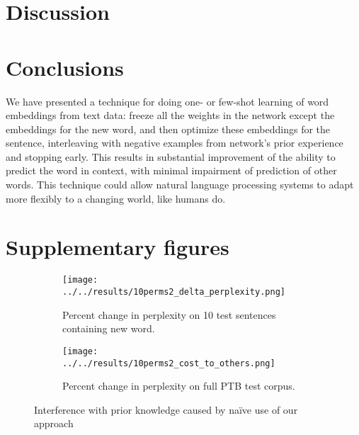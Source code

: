 \documentclass{article}
\begin{document}
\section{Discussion}

\section{Conclusions}
We have presented a technique for doing one- or few-shot learning of word embeddings from text data: freeze all the weights in the network except the embeddings for the new word, and then optimize these embeddings for the sentence, interleaving with negative examples from network's prior experience and stopping early. This results in substantial improvement of the ability to predict the word in context, with minimal impairment of prediction of other words. This technique could allow natural language processing systems to adapt more flexibly to a changing world, like humans do. 




\appendix
\section{Supplementary figures} \label{supp_fig_appdx}

\begin{figure}
\centering
\begin{subfigure}[b]{\textwidth}
\texttt{[image: ../../results/10perms2\_delta\_perplexity.png]}
\caption{Percent change in perplexity on 10 test sentences containing new word.}
\end{subfigure}
\begin{subfigure}[b]{\textwidth}
\texttt{[image: ../../results/10perms2\_cost\_to\_others.png]}
\caption{Percent change in perplexity on full PTB test corpus.}
\end{subfigure}
\caption{Interference with prior knowledge caused by na\"{i}ve use of our approach}
\label{interference_fig}
\end{figure}
\end{document}
